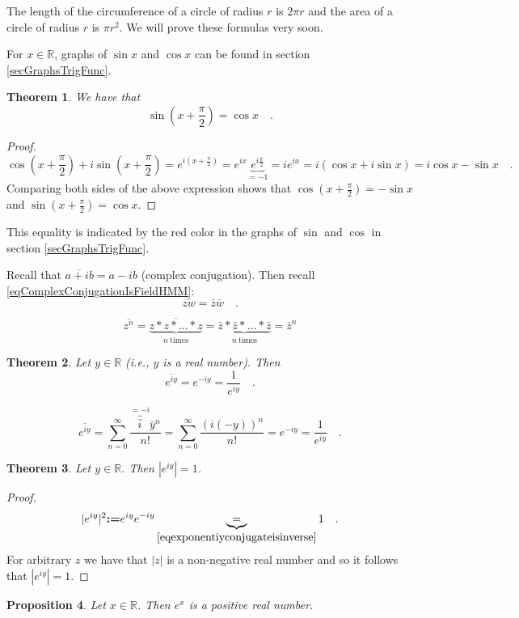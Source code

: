 \documentclass[12pt]{book}
\newcommand{\eqdef}{\textbf{:=}}
\newtheorem{theorem}{Theorem}[section]
\newtheorem{prop}[theorem]{Proposition}
\begin{document}
The length of the circumference of a circle of radius $r$ is $2\pi r$ and the area of a circle of radius $r$ is $\pi r^2$. We will prove these formulas very soon.

For $x\in \mathbb R$, graphs of $\sin x$ and $\cos x$ can be found in section \ref{secGraphsTrigFunc}.
\begin{theorem} We have that
\[
\sin \left(x+\frac{\pi}{2}\right)= \cos x \quad .
\]
\end{theorem}

\begin{proof}
\[
\cos\left(x+\frac{\pi}{2}\right)+ i\sin \left(x+\frac{\pi}2\right)=e^{i(x+\frac{\pi}{2})}= e^{ix} \underbrace{e^{ i\frac{\pi}2 }}_{=-1}= ie^{ix}= i(\cos x + i \sin x)= i\cos x- \sin x\quad .
\]
Comparing both sides of the above expression shows that $\cos(x+\frac{\pi}{2})=-\sin x$ and $\sin(x+\frac{\pi}{2})= \cos x$.
\end{proof}
This equality is indicated by the red color in the graphs of $\sin$ and $\cos$ in section \ref{secGraphsTrigFunc}.

Recall that $\overline{a+ib}=a-ib$  (complex conjugation). Then recall \eqref{eqComplexConjugationIsFieldHMM}:
\[
\overline {z w}= \bar z \bar w\quad .
\]

\[
\overline {z^n}= \overline {\underbrace{z*z*\dots*z}_{n\mathrm{~times}}} = \underbrace{\bar z* \bar z *\dots * \bar z}_{n\mathrm{~times}}= \bar {z}^n
\]

\begin{theorem}
Let $y\in \mathbb R$ (i.e., $y$ is a real number). Then
\begin{equation}\label{eqexponentiyconjugateisinverse}
\overline {e^{iy}}=e^{-iy}= \frac{1}{e^{iy}}\quad .
\end{equation}
\end{theorem}
\[
\overline {e^{iy}}= \sum_{n=0}^\infty \frac{\overbrace{\bar i}^{=-i} \bar y^n }{ n! }= \sum_{n=0}^\infty \frac{(i(-y))^n}{n!}=  e^{-iy}= \frac{1}{e^{iy}}\quad .
\]
\begin{theorem}
Let $y\in \mathbb R$. Then $|e^{iy}|=1$.
\end{theorem}
\begin{proof}
\[
|e^{iy}|^2 \eqdef e^{iy}e^{-iy}\underbrace{ =}_{ \eqref{eqexponentiyconjugateisinverse}} 1 \quad .
\]
For arbitrary $z$ we have that $|z|$ is a non-negative real number and so it follows that $|e^{iy}|=1$.
\end{proof}

\begin{prop}
Let $x\in \mathbb R$. Then $e^x$ is a positive real number.
\end{prop}
\end{document}
